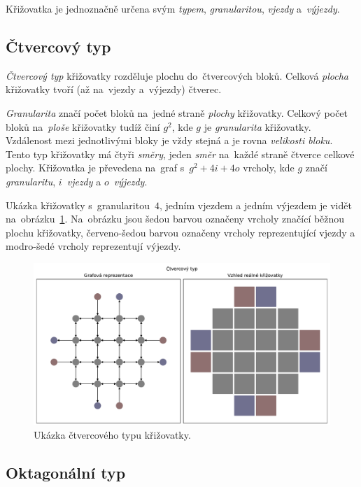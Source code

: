 Křižovatka je jednoznačně určena svým \emph{typem}, \emph{granularitou}, \emph{vjezdy} a~\emph{výjezdy}.

\subsection{Čtvercový typ}\label{subsec:ctvercovy-typ}

\emph{Čtvercový typ} křižovatky rozděluje plochu do~čtvercových bloků.
Celková \emph{plocha} křižovatky tvoří (až na~vjezdy a~výjezdy) čtverec.

\emph{Granularita} značí počet bloků na~jedné straně \emph{plochy} křižovatky.
Celkový počet bloků na~\emph{ploše} křižovatky tudíž činí $g^2$, kde $g$ je \emph{granularita} křižovatky.
Vzdálenost mezi jednotlivými bloky je vždy stejná a je rovna \emph{velikosti bloku}.
Tento typ křižovatky má čtyři \emph{směry}, jeden \emph{směr} na~každé straně čtverce celkové plochy.
Křižovatka je převedena na~graf s~$g^2 + 4i + 4o$ vrcholy, kde $g$ značí \emph{granularitu}, $i$~\emph{vjezdy} a $o$~\emph{výjezdy}.

Ukázka křižovatky s~granularitou~$4$, jedním vjezdem a jedním výjezdem je vidět na~obrázku~\ref{fig:square_type_graph}.
Na~obrázku jsou šedou barvou označeny vrcholy značící běžnou plochu křižovatky,
červeno-šedou barvou označeny vrcholy reprezentující vjezdy a modro-šedé vrcholy reprezentují výjezdy.

\begin{figure}[h]
	\centering
	\includegraphics[width=\textwidth]{../img/Square_grid}
	\caption{Ukázka čtvercového typu křižovatky.}
	\label{fig:square_type_graph}
\end{figure}

\subsection{Oktagonální typ}\label{subsec:octagonalni-typ}

